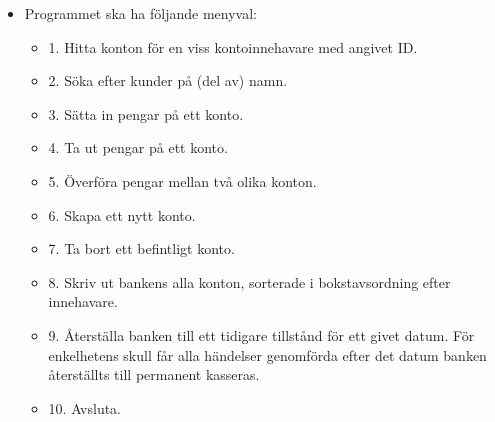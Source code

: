 \begin{itemize}
\item Programmet ska ha följande menyval:

\begin{itemize}
\item 1. Hitta konton för en viss kontoinnehavare med angivet ID.
\item 2. Söka efter kunder på (del av) namn.
\item 3. Sätta in pengar på ett konto.
\item 4. Ta ut pengar på ett konto.
\item 5. Överföra pengar mellan två olika konton.
\item 6. Skapa ett nytt konto.
\item 7. Ta bort ett befintligt konto.
\item 8. Skriv ut bankens alla konton, sorterade i bokstavsordning efter innehavare.
\item 9. Återställa banken till ett tidigare tillstånd för ett givet datum. För enkelhetens skull får alla händelser genomförda efter det datum banken återställts till permanent kasseras. 
\item 10. Avsluta.
\end{itemize}


\end{itemize}
